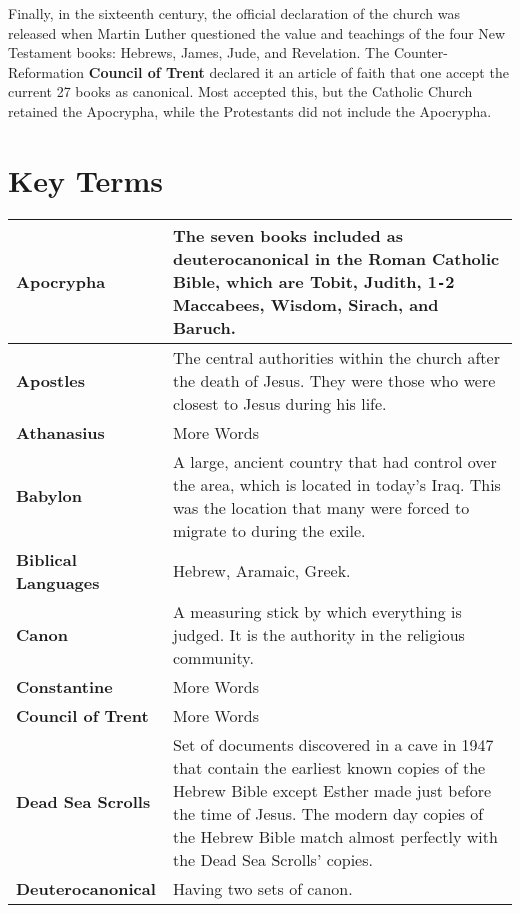 \documentclass{report}
\begin{document}
        Finally, in the sixteenth century, the official declaration of the church was released when Martin Luther questioned the value and teachings of the four New Testament books: Hebrews, James, Jude, and Revelation. The Counter-Reformation \textbf{Council of Trent} declared it an article of faith that one accept the current 27 books as canonical. Most accepted this, but the Catholic Church retained the Apocrypha, while the Protestants did not include the Apocrypha.

        \section{Key Terms}
        \begin{center}
            \begin{longtable}{| p{5cm} | p{7cm} |}
            \hline
            \textbf{Apocrypha} & The seven books included as deuterocanonical in the Roman Catholic Bible, which are Tobit, Judith, 1\texttt{-}2 Maccabees, Wisdom, Sirach, and Baruch.\\ \hline
            \textbf{Apostles} & The central authorities within the church after the death of Jesus. They were those who were closest to Jesus during his life.\\ \hline
            \textbf{Athanasius} & More Words \\ \hline
            \textbf{Babylon} & A large, ancient country that had control over the area, which is located in today's Iraq. This was the location that many were forced to migrate to during the exile.\\ \hline
            \textbf{Biblical Languages} & Hebrew, Aramaic, Greek.\\ \hline
            \textbf{Canon} & A measuring stick by which everything is judged. It is the authority in the religious community.\\ \hline
            \textbf{Constantine} & More Words \\ \hline
            \textbf{Council of Trent} & More Words \\ \hline
            \textbf{Dead Sea Scrolls} & Set of documents discovered in a cave in 1947 that contain the earliest known copies of the Hebrew Bible except Esther made just before the time of Jesus. The modern day copies of the Hebrew Bible match almost perfectly with the Dead Sea Scrolls' copies.\\ \hline
            \textbf{Deuterocanonical} & Having two sets of canon.\\ \hline

\end{longtable}
\end{center}
\end{document}
